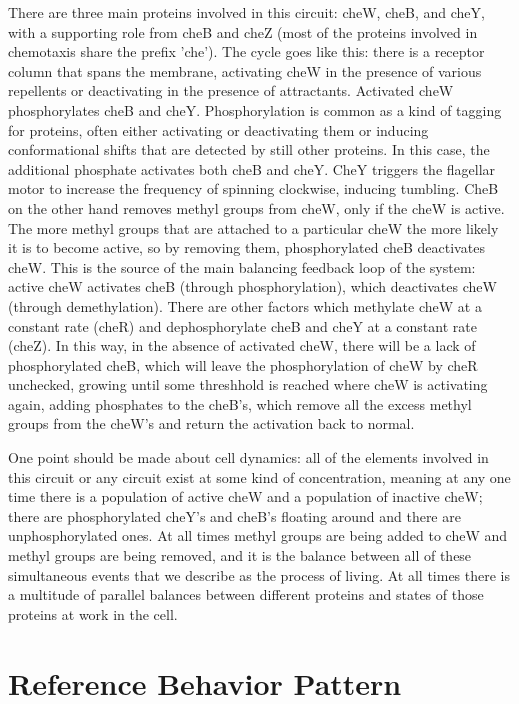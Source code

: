 \documentclass[12pt]{article}
\begin{document}
There are three main proteins involved in this circuit:  cheW, cheB, and cheY, with a supporting role from cheB and cheZ (most of the proteins involved in chemotaxis share the prefix 'che').  The cycle goes like this: there is a receptor column that spans the membrane, activating cheW in the presence of various repellents or deactivating in the presence of attractants.  Activated cheW phosphorylates cheB and cheY.  Phosphorylation is common as a kind of tagging for proteins, often either activating or deactivating them or inducing conformational shifts that are detected by still other proteins.  In this case, the additional phosphate activates both cheB and cheY.  CheY triggers the flagellar motor to increase the frequency of spinning clockwise, inducing tumbling.  CheB on the other hand removes methyl groups from cheW, only if the cheW is active.  The more methyl groups that are attached to a particular cheW the more likely it is to become active, so by removing them, phosphorylated cheB deactivates cheW.  This is the source of the main balancing feedback loop of the system:  active cheW activates cheB (through phosphorylation), which deactivates cheW (through demethylation).  There are other factors which methylate cheW at a constant rate (cheR) and dephosphorylate cheB and cheY at a constant rate (cheZ).  In this way, in the absence of activated cheW, there will be a lack of phosphorylated cheB, which will leave the phosphorylation of cheW by cheR unchecked, growing until some threshhold is reached where cheW is activating again, adding phosphates to the cheB's, which remove all the excess methyl groups from the cheW's and return the activation back to normal.  

One point should be made about cell dynamics: all of the elements involved in this circuit or any circuit exist at some kind of concentration, meaning at any one time there is a population of active cheW and a population of inactive cheW; there are phosphorylated cheY's and cheB's floating around and there are unphosphorylated ones.  At all times methyl groups are being added to cheW and methyl groups are being removed, and it is the balance between all of these simultaneous events that we describe as the process of living.  At all times there is a multitude of parallel balances between different proteins and states of those proteins at work in the cell.  

\section{Reference Behavior Pattern}
\end{document}
